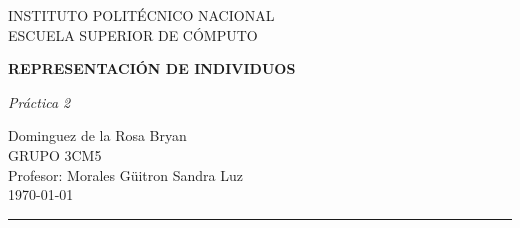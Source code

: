 \begin{titlepage}
\begin{center}
\begin{LARGE}
INSTITUTO POLITÉCNICO NACIONAL\\
\vspace*{0.15in}
ESCUELA SUPERIOR DE CÓMPUTO\\
\end{LARGE}
\vspace*{1.0in}
\begin{Large}
\textbf{REPRESENTACIÓN DE INDIVIDUOS} \\  
\end{Large}
\vspace*{0.2in}
\begin{large}
\textit{Práctica 2}\\
\end{large}
\vspace*{1.0in}
\begin{large}
Dominguez de la Rosa Bryan\\
\vspace*{2.0in}
GRUPO 3CM5\\
\vspace*{0.2in}
Profesor: Morales Güitron Sandra Luz\\
\vspace*{1.5in}
\today
\vspace*{0.3in}
\end{large}
\rule{150mm}{0.1mm}\\

\end{center}
\end{titlepage}

